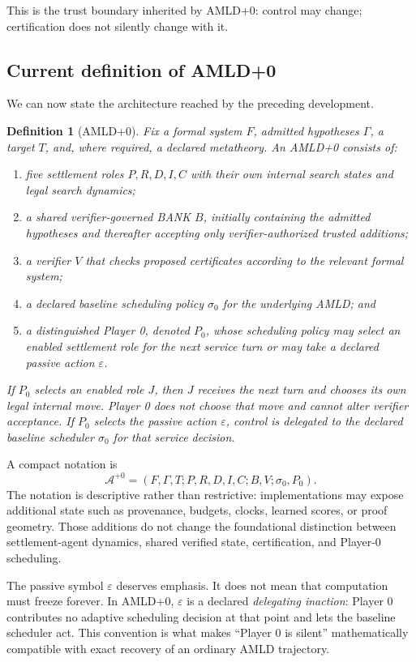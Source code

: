 \documentclass[11pt]{article}
\newtheorem{definition}{Definition}[section]
\begin{document}
This is the trust boundary inherited by AMLD+0: control may change; certification does not silently change with it.

\subsection{Current definition of AMLD+0}

We can now state the architecture reached by the preceding development.

\begin{definition}[AMLD+0]
Fix a formal system $F$, admitted hypotheses $\Gamma$, a target $T$, and, where required, a declared metatheory. An \emph{AMLD+0} consists of:
\begin{enumerate}
    \item five settlement roles $P,R,D,I,C$ with their own internal search states and legal search dynamics;
    \item a shared verifier-governed BANK $B$, initially containing the admitted hypotheses and thereafter accepting only verifier-authorized trusted additions;
    \item a verifier $V$ that checks proposed certificates according to the relevant formal system;
    \item a declared baseline scheduling policy $\sigma_0$ for the underlying AMLD; and
    \item a distinguished Player 0, denoted $P_0$, whose scheduling policy may select an enabled settlement role for the next service turn or may take a declared passive action $\varepsilon$.
\end{enumerate}
If $P_0$ selects an enabled role $J$, then $J$ receives the next turn and chooses its own legal internal move. Player 0 does not choose that move and cannot alter verifier acceptance. If $P_0$ selects the passive action $\varepsilon$, control is delegated to the declared baseline scheduler $\sigma_0$ for that service decision.
\end{definition}

A compact notation is
\[
\mathcal A^{+0}
=
(F,\Gamma,T;P,R,D,I,C;B,V;\sigma_0,P_0).
\]
The notation is descriptive rather than restrictive: implementations may expose additional state such as provenance, budgets, clocks, learned scores, or proof geometry. Those additions do not change the foundational distinction between settlement-agent dynamics, shared verified state, certification, and Player-0 scheduling.

The passive symbol $\varepsilon$ deserves emphasis. It does not mean that computation must freeze forever. In AMLD+0, $\varepsilon$ is a declared \emph{delegating inaction}: Player 0 contributes no adaptive scheduling decision at that point and lets the baseline scheduler act. This convention is what makes ``Player 0 is silent'' mathematically compatible with exact recovery of an ordinary AMLD trajectory.
\end{document}
